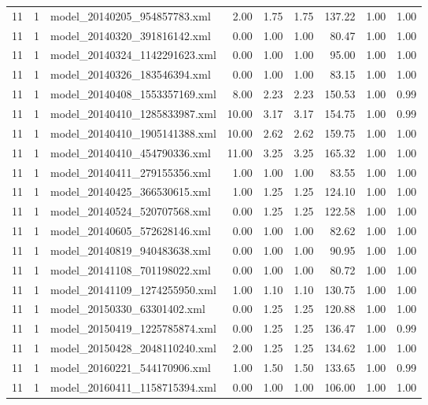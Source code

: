 \begin{table}[ht]
\begin{tabular}{rrlrrrrrr}
   11 &   1 & model\_20140205\_954857783.xml & 2.00 & 1.75 & 1.75 & 137.22 & 1.00 & 1.00 \\ 
   11 &   1 & model\_20140320\_391816142.xml & 0.00 & 1.00 & 1.00 & 80.47 & 1.00 & 1.00 \\ 
   11 &   1 & model\_20140324\_1142291623.xml & 0.00 & 1.00 & 1.00 & 95.00 & 1.00 & 1.00 \\ 
   11 &   1 & model\_20140326\_183546394.xml & 0.00 & 1.00 & 1.00 & 83.15 & 1.00 & 1.00 \\ 
   11 &   1 & model\_20140408\_1553357169.xml & 8.00 & 2.23 & 2.23 & 150.53 & 1.00 & 0.99 \\ 
   11 &   1 & model\_20140410\_1285833987.xml & 10.00 & 3.17 & 3.17 & 154.75 & 1.00 & 0.99 \\ 
   11 &   1 & model\_20140410\_1905141388.xml & 10.00 & 2.62 & 2.62 & 159.75 & 1.00 & 1.00 \\ 
   11 &   1 & model\_20140410\_454790336.xml & 11.00 & 3.25 & 3.25 & 165.32 & 1.00 & 1.00 \\ 
   11 &   1 & model\_20140411\_279155356.xml & 1.00 & 1.00 & 1.00 & 83.55 & 1.00 & 1.00 \\ 
   11 &   1 & model\_20140425\_366530615.xml & 1.00 & 1.25 & 1.25 & 124.10 & 1.00 & 1.00 \\ 
   11 &   1 & model\_20140524\_520707568.xml & 0.00 & 1.25 & 1.25 & 122.58 & 1.00 & 1.00 \\ 
   11 &   1 & model\_20140605\_572628146.xml & 0.00 & 1.00 & 1.00 & 82.62 & 1.00 & 1.00 \\ 
   11 &   1 & model\_20140819\_940483638.xml & 0.00 & 1.00 & 1.00 & 90.95 & 1.00 & 1.00 \\ 
   11 &   1 & model\_20141108\_701198022.xml & 0.00 & 1.00 & 1.00 & 80.72 & 1.00 & 1.00 \\ 
   11 &   1 & model\_20141109\_1274255950.xml & 1.00 & 1.10 & 1.10 & 130.75 & 1.00 & 1.00 \\ 
   11 &   1 & model\_20150330\_63301402.xml & 0.00 & 1.25 & 1.25 & 120.88 & 1.00 & 1.00 \\ 
   11 &   1 & model\_20150419\_1225785874.xml & 0.00 & 1.25 & 1.25 & 136.47 & 1.00 & 0.99 \\ 
   11 &   1 & model\_20150428\_2048110240.xml & 2.00 & 1.25 & 1.25 & 134.62 & 1.00 & 1.00 \\ 
   11 &   1 & model\_20160221\_544170906.xml & 1.00 & 1.50 & 1.50 & 133.65 & 1.00 & 0.99 \\ 
   11 &   1 & model\_20160411\_1158715394.xml & 0.00 & 1.00 & 1.00 & 106.00 & 1.00 & 1.00 \\ 

\end{tabular}
\end{table}

